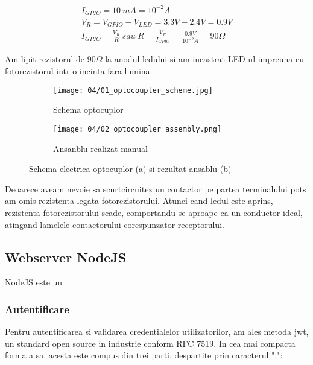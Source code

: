 \begin{center}
\begin{gather*}
I_{GPIO} =10\ mA=10^{-2} A\\
V_{R} =V_{GPIO} -V_{LED} =3.3V-2.4V=0.9V\\
I_{GPIO} =\frac{V_{R}}{R} \ sau\ R=\frac{V_{R}}{I_{GPIO}} =\frac{0.9V}{10^{-2}A} =90\Omega
\end{gather*}
\end{center}

Am lipit rezistorul de 90$\Omega$ la anodul ledului si am incastrat LED-ul impreuna cu fotorezistorul intr-o incinta fara lumina.

\begin{figure}[h!]
\centering
\begin{subfigure}{.5\textwidth}
  \centering
  \texttt{[image: 04/01\_optocoupler\_scheme.jpg]}
  \caption{Schema optocuplor \cite{OptocouplerCircuitsToday}}
  \label{fig:sub1}
\end{subfigure}%
\begin{subfigure}{.5\textwidth}
  \centering
  \texttt{[image: 04/02\_optocoupler\_assembly.png]}
  \caption{Ansanblu realizat manual}
  \label{fig:sub2}
\end{subfigure}
\caption{Schema electrica optocuplor (a) si rezultat ansablu (b)}
\label{fig:test}
\end{figure}

Deoarece aveam nevoie sa scurtcircuitez un contactor pe partea terminalului \acrshort{pots} am omis rezistenta legata fotorezistorului. Atunci cand ledul este aprins, rezistenta fotorezistorului scade, comportandu-se aproape ca un conductor ideal, atingand lamelele contactorului corespunzator receptorului.

\subsection {Webserver NodeJS}

NodeJS este un

\subsubsection {Autentificare}

Pentru autentificarea si validarea credentialelor utilizatorilor, am ales metoda \acrfull{jwt}, un standard open source in industrie conform RFC 7519. In cea mai compacta forma a sa, acesta este compus din trei parti, despartite prin caracterul ".":

